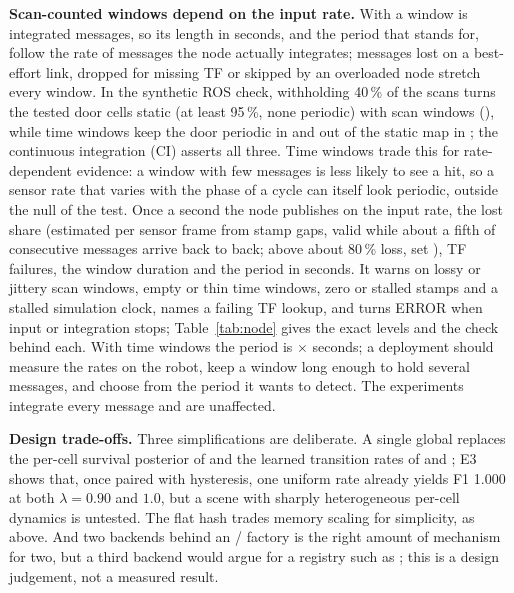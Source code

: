 \noindent\textbf{Scan-counted windows depend on the input rate.} With   a window is  integrated messages, so its length in seconds, and the period that  stands for, follow the rate of messages the node actually integrates; messages lost on a best-effort link, dropped for missing TF or skipped by an overloaded node stretch every window. In the synthetic ROS check, withholding 40\,\% of the scans turns the tested door cells static (at least 95\,\%, none periodic) with scan windows (), while time windows keep the door periodic in  and out of the static map in ; the continuous integration (CI) asserts all three. Time windows trade this for rate-dependent evidence: a window with few messages is less likely to see a hit, so a sensor rate that varies with the phase of a cycle can itself look periodic, outside the null of the test. Once a second the node publishes on  the input rate, the lost share (estimated per sensor frame from stamp gaps, valid while about a fifth of consecutive messages arrive back to back; above about 80\,\% loss, set ), TF failures, the window duration and the period in seconds. It warns on lossy or jittery scan windows, empty or thin time windows, zero or stalled stamps and a stalled simulation clock, names a failing TF lookup, and turns ERROR when input or integration stops; Table~\ref{tab:node} gives the exact levels and the check behind each. With time windows the period is  $\times$  seconds; a deployment should measure the rates on the robot, keep a window long enough to hold several messages, and choose  from the period it wants to detect. The experiments integrate every message and are unaffected.

\noindent\textbf{Design trade-offs.} Three simplifications are deliberate. A single global  replaces the per-cell survival posterior of \citet{rosen2016persistence} and the learned transition rates of \citet{tipaldi2013lifelong} and \citet{saarinen2012imac}; E3 shows that, once paired with hysteresis, one uniform rate already yields F1 1.000 at both $\lambda{=}0.90$ and $1.0$, but a scene with sharply heterogeneous per-cell dynamics is untested. The flat hash trades memory scaling for simplicity, as above. And two backends behind an / factory is the right amount of mechanism for two, but a third backend would argue for a registry such as  \citep{ros2pluginlib}; this is a design judgement, not a measured result.

